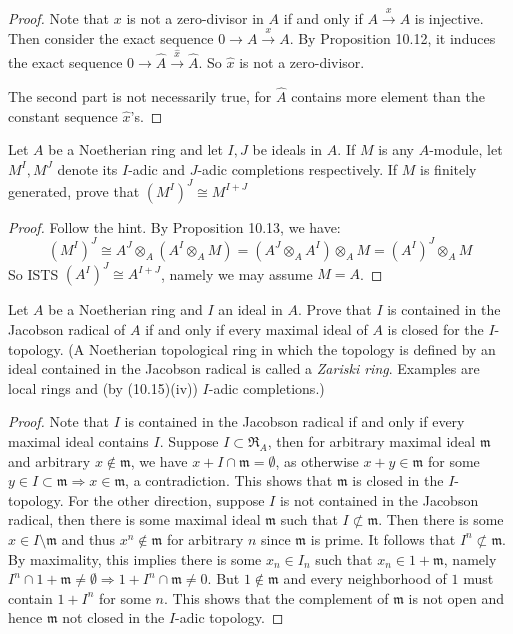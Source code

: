 \documentclass{solution}
\begin{document}
\begin{proof}
    Note that $x$ is not a zero-divisor in $A$ if and only if $A \xrightarrow{x} A$ is injective. Then consider the exact sequence $0 \rightarrow A \xrightarrow{x} A$. By Proposition 10.12, it induces the exact sequence $0 \rightarrow \hat{A} \xrightarrow{\hat{x}} \hat{A}$. So $\hat{x}$ is not a zero-divisor.

    The second part is not necessarily true, for $\hat{A}$ contains more element than the constant sequence $\hat{x}$'s. \TODO
\end{proof}

\begin{problem}
    Let $A$ be a Noetherian ring and let $I, J$ be ideals in $A$. If $M$ is any $A$-module, let $M^I, M^J$ denote its $I$-adic and $J$-adic completions respectively. If $M$ is finitely generated, prove that $(M^I)^J \cong M^{I + J}$
\end{problem}

\begin{proof}
    Follow the hint. By Proposition 10.13, we have:
    $$(M^I)^J \cong A^J \otimes_A (A^I \otimes_A M) = (A^J \otimes_A A^I) \otimes_A M = (A^I)^J \otimes_A M$$
    So ISTS $(A^I)^J \cong A^{I + J}$, namely we may assume $M = A$.

    \TODO
\end{proof}

\begin{problem}
    Let $A$ be a Noetherian ring and $I$ an ideal in $A$. Prove that $I$ is contained in the Jacobson radical of $A$ if and only if every maximal ideal of $A$ is closed for the $I$-topology. (A Noetherian topological ring in which the topology is defined by an ideal contained in the Jacobson radical is called a \textit{Zariski ring}. Examples are local rings and (by (10.15)(iv)) $I$-adic completions.)
\end{problem}

\begin{proof}
    Note that $I$ is contained in the Jacobson radical if and only if every maximal ideal contains $I$. Suppose $I \subset \mathfrak{R}_A$, then for arbitrary maximal ideal $\mathfrak{m}$ and arbitrary $x \notin \mathfrak{m}$, we have $x + I \cap \mathfrak{m} = \emptyset$, as otherwise $x + y \in \mathfrak{m}$ for some $y \in I \subset \mathfrak{m} \Rightarrow x \in \mathfrak{m}$, a contradiction. This shows that $\mathfrak{m}$ is closed in the $I$-topology. For the other direction, suppose $I$ is not contained in the Jacobson radical, then there is some maximal ideal $\mathfrak{m}$ such that $I \not \subset \mathfrak{m}$. Then there is some $x \in I \setminus \mathfrak{m}$ and thus $x^n \notin \mathfrak{m}$ for arbitrary $n$ since $\mathfrak{m}$ is prime. It follows that $I^n \not \subset \mathfrak{m}$. By maximality, this implies there is some $x_n \in I_n$ such that $x_n \in 1 + \mathfrak{m}$, namely $I^n \cap 1 + \mathfrak{m} \ne \emptyset \Rightarrow 1 + I^n \cap \mathfrak{m} \ne 0$. But $1 \notin \mathfrak{m}$ and every neighborhood of $1$ must contain $1 + I^n$ for some $n$. This shows that the complement of $\mathfrak{m}$ is not open and hence $\mathfrak{m}$ not closed in the $I$-adic topology.
\end{proof}
\end{document}
